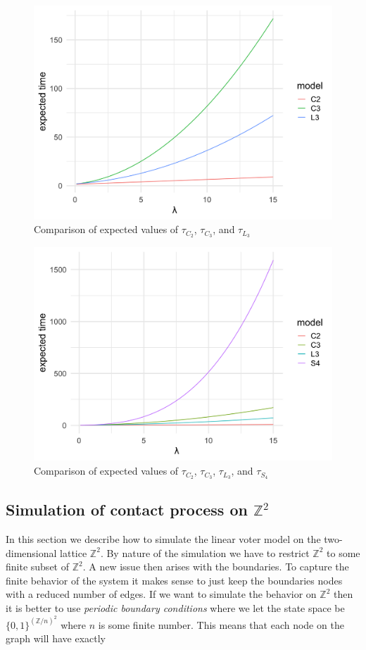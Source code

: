 \documentclass{article}
\theoremstyle{plain}
\theoremstyle{definition}
\theoremstyle{remark}
\numberwithin{equation}{section}
\newcommand{\Z}{\mathbb{Z}}
\begin{document}
\begin{figure}[H]
  \centering
    \includegraphics[width=.80\textwidth]{figures/ev_phase_comparison_3.png}
   \caption{Comparison of expected values of $\tau_{C_2}$, $\tau_{C_3}$, and $\tau_{L_3}$}
  \label{fig:ev_phase_comparison_3.png}
\end{figure}

\begin{figure}[H]
  \centering
    \includegraphics[width=.80\textwidth]{figures/ev_phase_comparison_4.png}
   \caption{Comparison of expected values of $\tau_{C_2}$, $\tau_{C_3}$, $\tau_{L_3}$, and $\tau_{S_4}$}
  \label{fig:ev_phase_comparison_4.png}
\end{figure}

\subsection{Simulation of contact process on \texorpdfstring{$\Z^2$}{Z2}}
In this section we describe how to simulate the linear voter model on the two-dimensional lattice $\Z^2$.
By nature of the simulation we have to restrict $\Z^2$ to some finite subset of $\Z^2$.
A new issue then arises with the boundaries.
To capture the finite behavior of the system it makes sense to just keep the boundaries nodes with a reduced number of edges.
If we want to simulate the behavior on $\Z^2$ then it is better to use \textit{periodic boundary conditions} where we let the state space be $\{0,1\}^{(\Z/n)^2}$ where $n$ is some finite number.
This means that each node on the graph will have exactly
\end{document}
